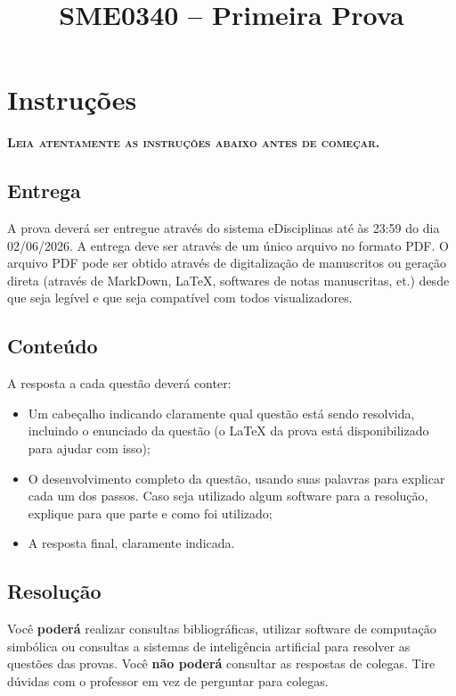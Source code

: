 \documentclass[oneside,12pt,a4paper]{article}
\title{SME0340 -- Primeira Prova}
\date{}
\author{}
\begin{document}
    \maketitle

    \section*{Instruções}

    \vspace*{0.5em}
    \textbf{\textsc{Leia atentamente as instruções abaixo antes de começar.}}

    \subsection*{Entrega}

    A prova deverá ser entregue através do sistema eDisciplinas até às 23:59 do dia 02/06/2026. A entrega deve ser através de um único arquivo no formato PDF. O arquivo PDF pode ser obtido através de digitalização de manuscritos ou geração direta (através de MarkDown, LaTeX, softwares de notas manuscritas, et.) desde que seja legível e que seja compatível com todos visualizadores.

    \subsection*{Conteúdo}

    A resposta a cada questão deverá conter:
    \begin{itemize}
        \item Um cabeçalho indicando claramente qual questão está sendo resolvida, incluindo o enunciado da questão (o LaTeX da prova está disponibilizado para ajudar com isso);

        \item O desenvolvimento completo da questão, usando suas palavras para explicar cada um dos passos. Caso seja utilizado algum software para a resolução, explique para que parte e como foi utilizado;

        \item A resposta final, claramente indicada.
    \end{itemize}

    \subsection*{Resolução}

    Você \textbf{poderá} realizar consultas bibliográficas, utilizar software de computação simbólica ou consultas a sistemas de inteligência artificial para resolver as questões das provas. Você \textbf{não poderá} consultar as respostas de colegas. Tire dúvidas com o professor em vez de perguntar para colegas.
\end{document}
